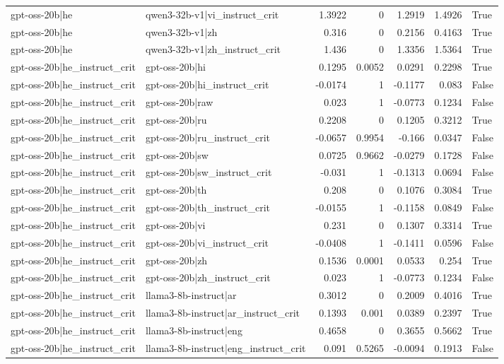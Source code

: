 \begin{table}
\begin{tabular}{l l r r r r l}
gpt-oss-20b|he & qwen3-32b-v1|vi_instruct_crit & 1.3922 & 0 & 1.2919 & 1.4926 & True \\
gpt-oss-20b|he & qwen3-32b-v1|zh & 0.316 & 0 & 0.2156 & 0.4163 & True \\
gpt-oss-20b|he & qwen3-32b-v1|zh_instruct_crit & 1.436 & 0 & 1.3356 & 1.5364 & True \\
gpt-oss-20b|he_instruct_crit & gpt-oss-20b|hi & 0.1295 & 0.0052 & 0.0291 & 0.2298 & True \\
gpt-oss-20b|he_instruct_crit & gpt-oss-20b|hi_instruct_crit & -0.0174 & 1 & -0.1177 & 0.083 & False \\
gpt-oss-20b|he_instruct_crit & gpt-oss-20b|raw & 0.023 & 1 & -0.0773 & 0.1234 & False \\
gpt-oss-20b|he_instruct_crit & gpt-oss-20b|ru & 0.2208 & 0 & 0.1205 & 0.3212 & True \\
gpt-oss-20b|he_instruct_crit & gpt-oss-20b|ru_instruct_crit & -0.0657 & 0.9954 & -0.166 & 0.0347 & False \\
gpt-oss-20b|he_instruct_crit & gpt-oss-20b|sw & 0.0725 & 0.9662 & -0.0279 & 0.1728 & False \\
gpt-oss-20b|he_instruct_crit & gpt-oss-20b|sw_instruct_crit & -0.031 & 1 & -0.1313 & 0.0694 & False \\
gpt-oss-20b|he_instruct_crit & gpt-oss-20b|th & 0.208 & 0 & 0.1076 & 0.3084 & True \\
gpt-oss-20b|he_instruct_crit & gpt-oss-20b|th_instruct_crit & -0.0155 & 1 & -0.1158 & 0.0849 & False \\
gpt-oss-20b|he_instruct_crit & gpt-oss-20b|vi & 0.231 & 0 & 0.1307 & 0.3314 & True \\
gpt-oss-20b|he_instruct_crit & gpt-oss-20b|vi_instruct_crit & -0.0408 & 1 & -0.1411 & 0.0596 & False \\
gpt-oss-20b|he_instruct_crit & gpt-oss-20b|zh & 0.1536 & 0.0001 & 0.0533 & 0.254 & True \\
gpt-oss-20b|he_instruct_crit & gpt-oss-20b|zh_instruct_crit & 0.023 & 1 & -0.0773 & 0.1234 & False \\
gpt-oss-20b|he_instruct_crit & llama3-8b-instruct|ar & 0.3012 & 0 & 0.2009 & 0.4016 & True \\
gpt-oss-20b|he_instruct_crit & llama3-8b-instruct|ar_instruct_crit & 0.1393 & 0.001 & 0.0389 & 0.2397 & True \\
gpt-oss-20b|he_instruct_crit & llama3-8b-instruct|eng & 0.4658 & 0 & 0.3655 & 0.5662 & True \\
gpt-oss-20b|he_instruct_crit & llama3-8b-instruct|eng_instruct_crit & 0.091 & 0.5265 & -0.0094 & 0.1913 & False \\

\end{tabular}
\end{table}
